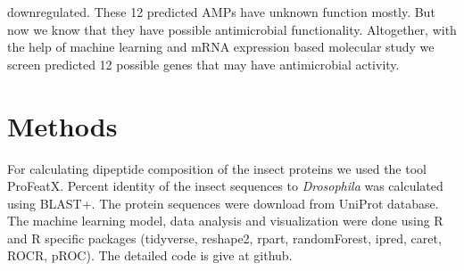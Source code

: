 \documentclass[letterpaper,11pt]{article}
\begin{document}
downregulated. These 12 predicted AMPs have unknown function mostly. But now we know that they have possible antimicrobial functionality. Altogether, with the help of machine learning and mRNA expression based molecular study we screen predicted 12 possible genes that may have antimicrobial activity.

\section{Methods}
For calculating dipeptide composition of the insect proteins we used the tool ProFeatX. Percent identity of the insect sequences to \textit{Drosophila} was calculated using BLAST+. The protein sequences were download from UniProt database. The machine learning model, data analysis and visualization were done using R and R specific packages (tidyverse, reshape2, rpart, randomForest, ipred, caret, ROCR, pROC). The detailed code is give at github. 



\end{document}
